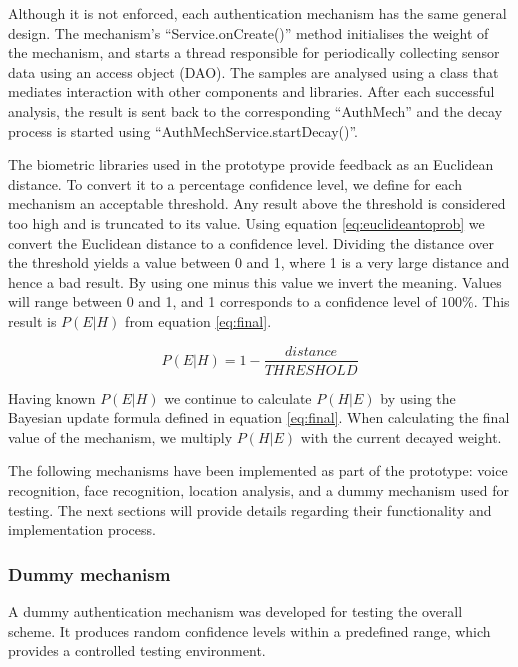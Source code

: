 Although it is not enforced, each authentication mechanism has the same general design. The mechanism's ``Service.onCreate()'' method initialises the weight of the mechanism, and starts a thread responsible for periodically collecting sensor data using an access object (DAO). The samples are analysed using a class that mediates interaction with other components and libraries. After each successful analysis, the result is sent back to the corresponding ``AuthMech'' and the decay process is started using ``AuthMechService.startDecay()''.

The biometric libraries used in the prototype provide feedback as an Euclidean distance. To convert it to a percentage confidence level, we define for each mechanism an acceptable threshold. Any result above the threshold is considered too high and is truncated to its value. Using equation \ref{eq:euclideantoprob} we convert the Euclidean distance to a confidence level. Dividing the distance over the threshold yields a value between 0 and 1, where 1 is a very large distance and hence a bad result. By using one minus this value we invert the meaning. Values will range between 0 and 1, and 1 corresponds to a confidence level of $100\%$. This result is $P(E|H)$ from equation \ref{eq:final}.

\begin{equation} 
\label{eq:euclideantoprob}
P(E|H) = 1 - \frac{distance}{THRESHOLD}
\end{equation}

Having known $P(E|H)$ we continue to calculate $P(H|E)$ by using the Bayesian update formula defined in equation \ref{eq:final}. When calculating the final value of the mechanism, we multiply $P(H|E)$ with the current decayed weight.

The following mechanisms have been implemented as part of the prototype: voice recognition, face recognition, location analysis, and a dummy mechanism used for testing. The next sections will provide details regarding their functionality and implementation process.

\subsubsection{Dummy mechanism}
A dummy authentication mechanism was developed for testing the overall scheme. It produces random confidence levels within a predefined range, which provides a controlled testing environment.

